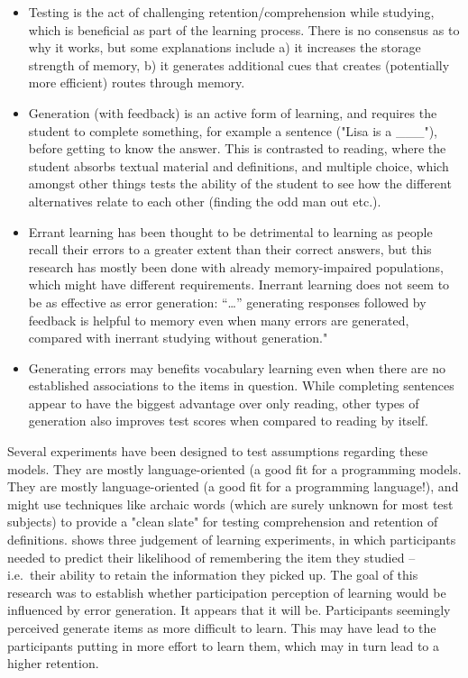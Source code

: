 \begin{itemize}

\item Testing is the act of challenging retention/comprehension while studying,
  which is beneficial as part of the learning process. There is no consensus as
  to why it works, but some explanations include a) it increases the storage
  strength of memory, b) it generates additional cues that creates (potentially
  more efficient) routes through memory.\cite[p.6]{potts2014benefit}

\item Generation (with feedback) is an active form of learning, and requires the
  student to complete something, for example a sentence ("Lisa is a \_\_\_"),
  before getting to know the answer. This is contrasted to reading, where the
  student absorbs textual material and definitions, and multiple choice, which
  amongst other things tests the ability of the student to see how the different
  alternatives relate to each other (finding the odd man out etc.).

\item Errant learning has been thought to be detrimental to learning as people
  recall their errors to a greater extent than their correct
  answers\cite{potts2014benefit}, but this research has mostly been done with
  already memory-impaired populations, which might have different requirements.
  Inerrant learning does not seem to be as effective as error generation: 
  ``\dots'' generating responses followed by feedback is helpful to memory 
  even when many errors are generated, compared with inerrant studying without
  generation."\cite[p.54]{potts2014benefit}

\item Generating errors may benefits vocabulary learning even when there are 
  no established associations to the items in 
  question\cite[p.54]{potts2014benefit}. While completing sentences appear to 
  have the biggest advantage over only reading, other types of generation also 
  improves test scores when compared to reading by 
  itself\cite[p.73]{benassi2014applying}.

\end{itemize}

Several experiments have been designed to test assumptions regarding
these models. They are mostly language-oriented (a good fit for a programming
models. They are mostly language-oriented (a good fit for a programming
language!), and might use techniques like archaic words (which are surely
unknown for most test subjects) to provide a "clean slate" for testing
comprehension and retention of definitions. \cite{potts2014benefit} shows 
three judgement of learning experiments, in which participants needed to 
predict their likelihood of remembering the item they studied -- i.e.\ their 
ability to retain the information they picked up. The goal of this research 
was to establish whether participation perception of learning would be 
influenced by error generation. It appears that it will be. Participants 
seemingly perceived generate items as more difficult to learn. This may have 
lead to the participants putting in more effort to learn them, which may in 
turn lead to a higher retention.

